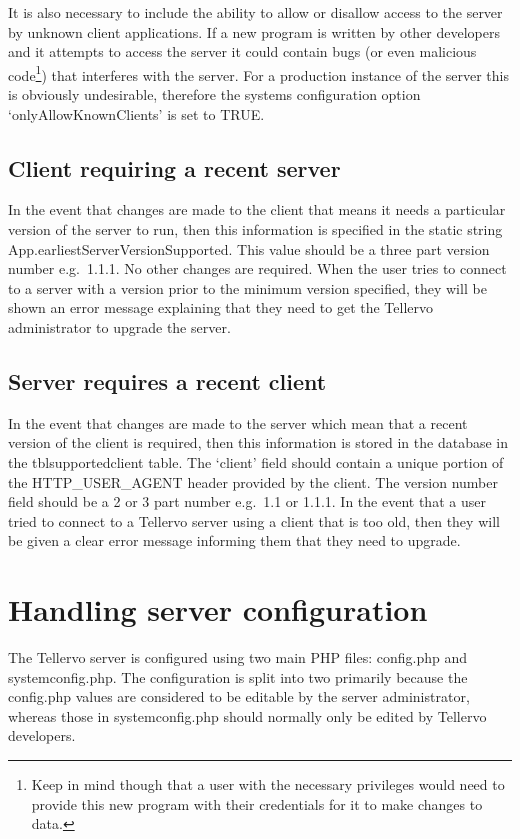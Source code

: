 It is also necessary to include the ability to allow or disallow access to the server by unknown client applications.  If a new program is written by other developers and it attempts to access the server it could contain bugs (or even malicious code\footnote{Keep in mind though that a user with the necessary privileges would need to provide this new program with their credentials for it to make changes to data.}) that interferes with the server.  For a production instance of the server this is obviously undesirable, therefore the systems configuration option `onlyAllowKnownClients' is set to TRUE.  

\subsection{Client requiring a recent server}

In the event that changes are made to the client that means it needs a particular version of the server to run, then this information is specified in the static string App.earliestServerVersionSupported.  This value should be a three part version number e.g.\ 1.1.1.  No other changes are required.  When the user tries to connect to a server with a version prior to the minimum version specified, they will be shown an error message explaining that they need to get the Tellervo administrator to upgrade the server.  

\subsection{Server requires a recent client}

In the event that changes are made to the server which mean that a recent version of the client is required, then this information is stored in the database in the tblsupportedclient table.  The `client' field should contain a unique portion of the HTTP\_USER\_AGENT header provided by the client.  The version number field should be a 2 or 3 part number e.g.\ 1.1 or 1.1.1.  In the event that a user tried to connect to a Tellervo server using a client that is too old, then they will be given a clear error message informing them that they need to upgrade.


\section{Handling server configuration}
The Tellervo server is configured using two main PHP files: config.php and systemconfig.php.  The configuration is split into two primarily because the config.php values are considered to be editable by the server administrator, whereas those in systemconfig.php should normally only be edited by Tellervo developers.  

